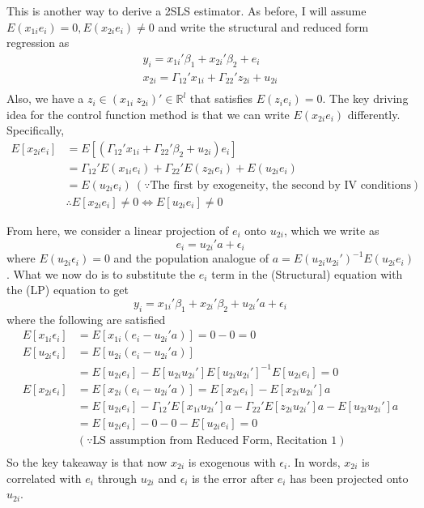 \documentclass[12pt]{article}
\theoremstyle{definition}
\theoremstyle{property}
\theoremstyle{assumption}
\theoremstyle{example}
\theoremstyle{comment}
\begin{document}
This is another way to derive a 2SLS estimator. As before, I will assume $E(x_{1i}e_i)=0, E(x_{2i}e_i)\neq0$ and write the structural and reduced form regression as
\begin{gather*}
y_i = x_{1i}'\beta_1 + x_{2i}'\beta_2+e_i \tag{Structural}\\
x_{2i}=\Gamma_{12}'x_{1i}+\Gamma_{22}'z_{2i}+u_{2i} \tag{Reduced Form}\\
\end{gather*}
Also, we have a $z_i\in( x_{1i}\  z_{2i})'\in\mathbb{R}^l$ that satisfies $E(z_ie_i)=0$. The key driving idea for the control function method is that we can write $E(x_{2i}e_i)$ differently. Specifically, 
\[
\begin{aligned}
E[x_{2i}e_i]&= E[(\Gamma_{12}'x_{1i}+\Gamma_{22}'\beta_2+u_{2i})e_i]\\
&= \Gamma_{12}'E(x_{1i}e_i)+\Gamma_{22}'E(z_{2i}e_i)+E(u_{2i}e_i)\\
&= E(u_{2i}e_i) \ (\because \text{The first by exogeneity, the second by IV conditions})\\
&\therefore E[x_{2i}e_i]\neq 0 \iff E[u_{2i}e_i]\neq 0 
\end{aligned}
\]\par
From here, we consider a linear projection of $e_i$ onto $u_{2i}$, which we write as
\[
e_i  = u_{2i}'a+\epsilon_i \tag{LP}
\]
where $E(u_{2i}\epsilon_i)=0$ and the population analogue of $a=E(u_{2i}u_{2i}')^{-1}E(u_{2i}e_i)$. What we now do is to substitute the $e_i$ term in the (Structural) equation with the (LP) equation to get
\[
y_i = x_{1i}'\beta_1 + x_{2i}'\beta_2+ u_{2i}'a+\epsilon_i   \tag{CFA}
\]
where the following are satisfied
\[
\begin{aligned}
E[x_{1i}\epsilon_i]&=E[x_{1i}(e_i-u_{2i}'a)]=0-0=0 \\
E[u_{2i}\epsilon_i]&=E[u_{2i}(e_i-u_{2i}'a)]\\
&=E[u_{2i}e_i]-E[u_{2i}u_{2i}']E[u_{2i}u_{2i}']^{-1}E[u_{2i}e_i]=0 \\
E[x_{2i}\epsilon_i]&=E[x_{2i}(e_i-u_{2i}'a)]=E[x_{2i}e_i]-E[x_{2i}u_{2i}']a \\
&=E[u_{2i}e_i]-\Gamma_{12}'E[x_{1i}u_{2i}']a-\Gamma_{22}'E[z_{2i}u_{2i}']a-E[u_{2i}u_{2i}']a\\
&=E[u_{2i}e_i]-0-0-E[u_{2i}e_i]=0 \\
&(\because\text{LS assumption from Reduced Form, Recitation 1})\\
\end{aligned}
\]
So the key takeaway is that now $x_{2i}$ is exogenous with $\epsilon_i$. In words, $x_{2i}$ is correlated with $e_i$ through $u_{2i}$ and $\epsilon_i$ is the error after $e_i$ has been projected onto $u_{2i}$.  \par
\end{document}
